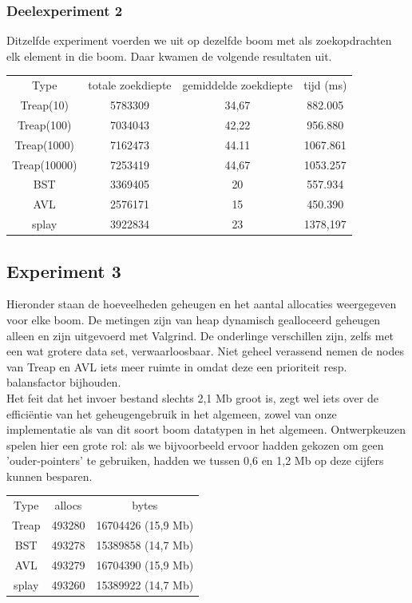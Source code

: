 \documentclass[a4paper,10pt]{article}
\begin{document}
\subsubsection{Deelexperiment 2}
Ditzelfde experiment voerden we uit op dezelfde boom met als zoekopdrachten elk element in die boom. Daar kwamen de volgende resultaten uit. \\

\begin{center}
\begin{tabular}{c c c c}
Type & totale zoekdiepte & gemiddelde zoekdiepte & tijd (ms) \\
Treap(10) & 5783309 & 34,67 & 882.005 \\
Treap(100) & 7034043 & 42,22 & 956.880 \\
Treap(1000) & 7162473 & 44.11 & 1067.861 \\
Treap(10000) & 7253419 & 44,67 & 1053.257 \\
BST & 3369405 & 20 & 557.934 \\
AVL & 2576171 & 15 & 450.390 \\
splay & 3922834 & 23 & 1378,197  \\
\end{tabular}
\end{center}

\subsection{Experiment 3}
Hieronder staan de hoeveelheden geheugen en het aantal allocaties weergegeven voor elke boom. De metingen zijn van heap dynamisch gealloceerd geheugen alleen en zijn uitgevoerd met Valgrind. De onderlinge verschillen zijn, zelfs met een wat grotere data set, verwaarloosbaar. Niet geheel verassend nemen de nodes van Treap en AVL iets meer ruimte in omdat deze een prioriteit resp. balansfactor bijhouden.\\
Het feit dat het invoer bestand slechts 2,1 Mb groot is, zegt wel iets over de effici\"entie van het geheugengebruik in het algemeen,
zowel van onze implementatie als van dit soort boom datatypen in het algemeen. Ontwerpkeuzen spelen hier een grote rol: als we bijvoorbeeld ervoor hadden gekozen om geen 'ouder-pointers' te gebruiken, hadden we tussen 0,6 en 1,2 Mb op deze cijfers kunnen besparen. 

\begin{center}
\begin{tabular}{c c c}
Type & allocs & bytes \\
Treap & 493280 & 16704426 (15,9 Mb) \\
BST & 493278 & 15389858 (14,7 Mb) \\
AVL & 493279 & 16704390 (15,9 Mb)\\
splay & 493260 & 15389922 (14,7 Mb)\\
\end{tabular}
\end{center}
\end{document}

